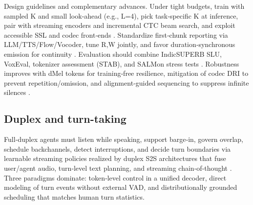 Design guidelines and complementary advances. Under tight budgets, train with sampled K and small look‑ahead (e.g., L=4), pick task‑specific K at inference, pair with streaming encoders and incremental CTC beam search, and exploit accessible SSL and codec front‑ends \cite{ouyang2025cmusiwslt2025simultaneousspeechtranslati,chen2023reducingbarriersselfsupervisedlearninghu,dhawan2024codecasrtrainingperformantautomaticspeec,sheng2025syncspeechlowlatencyefficientdualstreamt}. Standardize first‑chunk reporting via LLM/TTS/Flow/Vocoder, tune R,W jointly, and favor duration‑synchronous emission for continuity \cite{fang2025llamaomni2llmbasedrealtimespokenchatbota,sheng2025syncspeechlowlatencyefficientdualstreamt}. Evaluation should combine IndicSUPERB SLU, VoxEval, tokenizer assessment (STAB), and SALMon stress tests \cite{entry2025indicsuperbspeechprocessinguniversalperf,cui2025voxevalbenchmarkingknowledgeunderstandin,vashishth2024stabspeechtokenizerassessmentbenchmark,maimon2025salmonsuiteacousticlanguagemodelevaluati}. Robustness improves with dMel tokens for training‑free resilience, mitigation of codec DRI to prevent repetition/omission, and alignment‑guided sequencing to suppress infinite silences \cite{bai2025dmelspeechtokenizationmadesimple,liu2024analyzingmitigatinginconsistencydiscrete,li2024investigatingneuralaudiocodecsspeechlang,song2024ellavstableneuralcodeclanguagemodelingal}.



\subsection{Duplex and turn-taking} \label{subsec:Duplex and turn-taking}

Full‑duplex agents must listen while speaking, support barge‑in, govern overlap, schedule backchannels, detect interruptions, and decide turn boundaries via learnable streaming policies realized by duplex S2S architectures that fuse user/agent audio, turn‑level text planning, and streaming chain‑of‑thought \cite{hu2025salmduplexefficientdirectmodelingspeechl,cui2025thinkbeforeyoutalkenhancingmeaningfuldia,guo2025streamuniachievingstreamingspeechtransla}. Three paradigms dominate: token‑level control in a unified decoder, direct modeling of turn events without external VAD, and distributionally grounded scheduling that matches human turn statistics.

